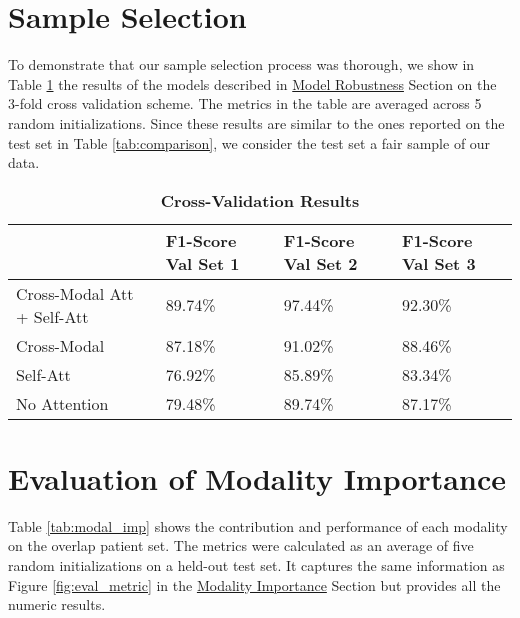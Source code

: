\section{Sample Selection}
\label{section:samp_sel}
To demonstrate that our sample selection process was thorough, we show in Table \ref{tab:cross_val} the results of the models described in {\hyperref[subsection:robust]{Model Robustness} Section} on the 3-fold cross validation scheme. The metrics in the table are averaged across 5 random initializations. Since these results are similar to the ones reported on the test set in Table \ref{tab:comparison}, we consider the test set a fair sample of our data. 

\begin{table}[H]
\caption{\textbf{Cross-Validation Results}}\label{tab:cross_val}
\begin{tabular}{|l|l|l|l|}
\hline
                           & \textbf{F1-Score Val Set 1} & \textbf{F1-Score Val Set 2} & \textbf{F1-Score Val Set 3} \\ \hline
Cross-Modal Att + Self-Att & 89.74\%                     & 97.44\%                     & 92.30\%                     \\ \hline
Cross-Modal                & 87.18\%                     & 91.02\%                     & 88.46\%                     \\ \hline
Self-Att                   & 76.92\%                     & 85.89\%                     & 83.34\%                     \\ \hline
No Attention               & 79.48\%                     & 89.74\%                     & 87.17\%                     \\ \hline
\end{tabular}
\end{table}

\section{Evaluation of Modality Importance}
\label{section:modality_importance}
Table \ref{tab:modal_imp} shows the contribution and performance of each modality on the overlap patient set. The metrics were calculated as an average of five random initializations on a held-out test set. It captures the same information as Figure \ref{fig:eval_metric} in the {\hyperref[subsection:eval_imp]{Modality Importance} Section} but provides all the numeric results. 

